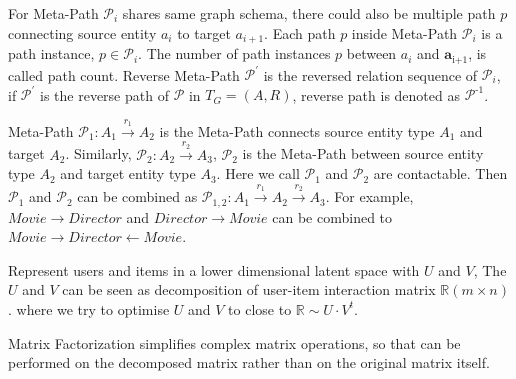 For Meta-Path $\mathcal{P}_i$ shares same graph schema, there could also be multiple path $p$ connecting source entity $a_i$ to target ${a}_{i+1}$. Each path $p$ inside Meta-Path $\mathcal{P}_i$ is a path instance, $p \in \mathcal{P}_i$. The number of path instances $p$ between $a_i$ and $\bm{a}_\text{i+1}$, is called path count. Reverse Meta-Path $\mathcal{P}^{'}$ is the reversed relation sequence of $\mathcal{P}_i$, if $\mathcal{P}^{'}$ is the reverse path of $\mathcal{P}$ in $T_G = (A, R)$, reverse path is denoted as $\mathcal{P}^\text{-1}$. \newline

Meta-Path $\mathcal{P}_1: A_1 \xrightarrow{r_1} A_2$ is the Meta-Path connects source entity type $A_1$ and target $A_2$.
Similarly, $\mathcal{P}_2: A_2 \xrightarrow{r_2} A_3$, $\mathcal{P}_2$ is the Meta-Path between source entity type $A_\text{2}$ and target entity type $A_\text{3}$.
Here we call $\mathcal{P}_1$ and $\mathcal{P}_2$ are contactable. Then $\mathcal{P}_1$ and $\mathcal{P}_2$ can be combined as $\mathcal{P}_{1,2}: A_1 \xrightarrow{r_1} A_2 \xrightarrow{r_2} A_3$. For example, $Movie \rightarrow Director$ and $Director \rightarrow Movie$ can be combined to $Movie \rightarrow Director \leftarrow Movie$. 

\begin{definition}\label{def:mfdf}
    Represent users and items in a lower dimensional latent space with $U$ and $V$, The $U$ and $V$ can be seen as decomposition of user-item interaction matrix $\mathbb{R} (m \times n)$. where we try to optimise $U$ and $V$ to close to $\mathbb{R} \sim U \cdot V^t$. 
\end{definition}
Matrix Factorization simplifies complex matrix operations, so that can be performed on the decomposed matrix rather than on the original matrix itself.

